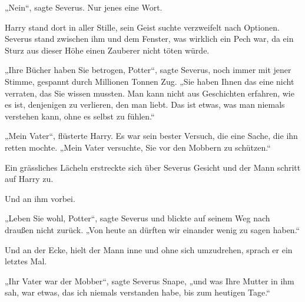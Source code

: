 „Nein“, sagte Severus. Nur jenes eine Wort.

Harry stand dort in aller Stille, sein Geist suchte verzweifelt nach Optionen. Severus stand zwischen ihm und dem Fenster, was wirklich ein Pech war, da ein Sturz aus dieser Höhe einen Zauberer nicht töten würde.

„Ihre Bücher haben Sie betrogen, Potter“, sagte Severus, noch immer mit jener Stimme, gespannt durch Millionen Tonnen Zug. „Sie haben Ihnen das eine nicht verraten, das Sie wissen mussten. Man kann nicht aus Geschichten erfahren, wie es ist, denjenigen zu verlieren, den man liebt. Das ist etwas, was man niemals verstehen kann, ohne es selbst zu fühlen.“

„Mein Vater“, flüsterte Harry. Es war sein bester Versuch, die eine Sache, die ihn retten mochte. „Mein Vater versuchte, Sie vor den Mobbern zu schützen.“

Ein grässliches Lächeln erstreckte sich über Severus Gesicht und der Mann schritt auf Harry zu.

Und an ihm vorbei.

„Leben Sie wohl, Potter“, sagte Severus und blickte auf seinem Weg nach draußen nicht zurück. „Von heute an dürften wir einander wenig zu sagen haben.“

Und an der Ecke, hielt der Mann inne und ohne sich umzudrehen, sprach er ein letztes Mal.

„Ihr Vater war der Mobber“, sagte Severus Snape, „und was Ihre Mutter in ihm sah, war etwas, das ich niemals verstanden habe, bis zum heutigen Tage.“

